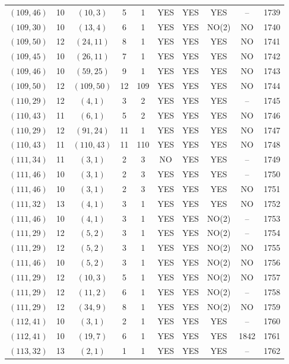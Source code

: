 \begin{longtable}{|c|c|c|c|c|c|c|c|c|c|}
$(109, 46)$ & 10 & $(10, 3)$ & 5 & 1 & YES & YES & YES & -- & 1739\\
$(109, 30)$ & 10 & $(13, 4)$ & 6 & 1 & YES & YES & NO(2) & NO & 1740\\
$(109, 50)$ & 12 & $(24, 11)$ & 8 & 1 & YES & YES & YES & NO & 1741\\
$(109, 45)$ & 10 & $(26, 11)$ & 7 & 1 & YES & YES & YES & NO & 1742\\
$(109, 46)$ & 10 & $(59, 25)$ & 9 & 1 & YES & YES & YES & NO & 1743\\
$(109, 50)$ & 12 & $(109, 50)$ & 12 & 109 & YES & YES & YES & NO & 1744\\
$(110, 29)$ & 12 & $(4, 1)$ & 3 & 2 & YES & YES & YES & -- & 1745\\
$(110, 43)$ & 11 & $(6, 1)$ & 5 & 2 & YES & YES & YES & NO & 1746\\
$(110, 29)$ & 12 & $(91, 24)$ & 11 & 1 & YES & YES & YES & NO & 1747\\
$(110, 43)$ & 11 & $(110, 43)$ & 11 & 110 & YES & YES & YES & NO & 1748\\
$(111, 34)$ & 11 & $(3, 1)$ & 2 & 3 & NO & YES & YES & -- & 1749\\
$(111, 46)$ & 10 & $(3, 1)$ & 2 & 3 & YES & YES & YES & -- & 1750\\
$(111, 46)$ & 10 & $(3, 1)$ & 2 & 3 & YES & YES & YES & NO & 1751\\
$(111, 32)$ & 13 & $(4, 1)$ & 3 & 1 & YES & YES & YES & NO & 1752\\
$(111, 46)$ & 10 & $(4, 1)$ & 3 & 1 & YES & YES & NO(2) & -- & 1753\\
$(111, 29)$ & 12 & $(5, 2)$ & 3 & 1 & YES & YES & NO(2) & -- & 1754\\
$(111, 29)$ & 12 & $(5, 2)$ & 3 & 1 & YES & YES & NO(2) & NO & 1755\\
$(111, 46)$ & 10 & $(5, 2)$ & 3 & 1 & YES & YES & NO(2) & NO & 1756\\
$(111, 29)$ & 12 & $(10, 3)$ & 5 & 1 & YES & YES & NO(2) & NO & 1757\\
$(111, 29)$ & 12 & $(11, 2)$ & 6 & 1 & YES & YES & NO(2) & -- & 1758\\
$(111, 29)$ & 12 & $(34, 9)$ & 8 & 1 & YES & YES & NO(2) & NO & 1759\\
$(112, 41)$ & 10 & $(3, 1)$ & 2 & 1 & YES & YES & YES & -- & 1760\\
$(112, 41)$ & 10 & $(19, 7)$ & 6 & 1 & YES & YES & YES & 1842 & 1761\\
$(113, 32)$ & 13 & $(2, 1)$ & 1 & 1 & YES & YES & YES & -- & 1762\\

\end{longtable}
